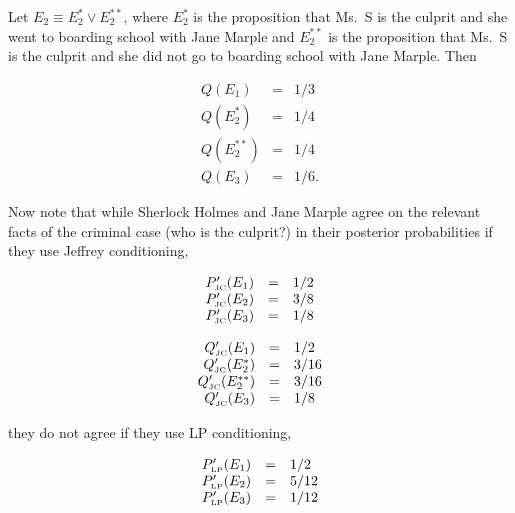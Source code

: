 \documentclass[11pt]{article}
\begin{document}
Let $E_{2}\equiv{}E_{2}^{*}\vee{}E_{2}^{**}$, where $E_{2}^{*}$ is the
proposition that Ms.\ S is the culprit and she went to boarding school
with Jane Marple and $E_{2}^{**}$ is the proposition that Ms.\ S is
the culprit and she did not go to boarding school with Jane Marple.
Then

\begin{equation}
  \label{eq:marpleprior}
  \begin{array}{rcl}
  Q(E_{1})&=&1/3\\
  Q(E_{2}^{*})&=&1/4\\
  Q(E_{2}^{**})&=&1/4\\
  Q(E_{3})&=&1/6.
\end{array}
\end{equation}

Now note that while Sherlock Holmes and Jane Marple agree on the
relevant facts of the criminal case (who is the culprit?) in their
posterior probabilities if they use Jeffrey conditioning,

\begin{equation}
  \label{eq:sherlockposteriorjc}
  \begin{array}{rcl}
  P'_{\mbox{\tiny JC}}(E_{1})&=&1/2\\
  P'_{\mbox{\tiny JC}}(E_{2})&=&3/8\\
  P'_{\mbox{\tiny JC}}(E_{3})&=&1/8
\end{array}
\end{equation}

\begin{equation}
  \label{eq:marpleposteriorjc}
  \begin{array}{rcl}
  Q'_{\mbox{\tiny JC}}(E_{1})&=&1/2\\
  Q'_{\mbox{\tiny JC}}(E_{2}^{*})&=&3/16\\
  Q'_{\mbox{\tiny JC}}(E_{2}^{**})&=&3/16\\
  Q'_{\mbox{\tiny JC}}(E_{3})&=&1/8
\end{array}
\end{equation}

they do not agree if they use LP conditioning,

\begin{equation}
  \label{eq:sherlockposteriorlp}
  \begin{array}{rcl}
  P'_{\mbox{\tiny LP}}(E_{1})&=&1/2\\
  P'_{\mbox{\tiny LP}}(E_{2})&=&5/12\\
  P'_{\mbox{\tiny LP}}(E_{3})&=&1/12
\end{array}
\end{equation}
\end{document}
